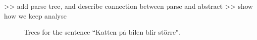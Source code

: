 \documentclass{report}
\begin{document}
>> add parse tree, and describe connection between parse and abstract
>> show how we keep analyse
\begin{figure}[h]
\centering
{}
\caption{Trees for the sentence ``Katten på bilen blir större".}
\label{fig:translationtrees}
\end{figure}
\end{document}
